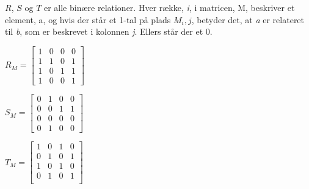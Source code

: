 \documentclass{article}
\begin{document}
$R$, $S$ og $T$ er alle binære relationer. Hver række, \emph{i}, i matricen, M, beskriver et element, a, og hvis der står et 1-tal på plads $M_i,j$, betyder det, at \emph{a} er relateret til \emph{b}, som er beskrevet i kolonnen \emph{j}. Ellers står der et 0.

\begin{center}
\begin{math}
R_M = \begin{bmatrix}
1 & 0 & 0 & 0 \\
1 & 1 & 0 & 1 \\
1 & 0 & 1 & 1 \\
1 & 0 & 0 & 1 
\end{bmatrix} 
\end{math}\par 
\begin{math}
S_M = \begin{bmatrix}
0 & 1 & 0 & 0 \\
0 & 0 & 1 & 1 \\
0 & 0 & 0 & 0 \\
0 & 1 & 0 & 0 
\end{bmatrix}
\end{math} \par 
\begin{math}
T_M = \begin{bmatrix}
1 & 0 & 1 & 0 \\
0 & 1 & 0 & 1 \\
1 & 0 & 1 & 0 \\
0 & 1 & 0 & 1 \\
\end{bmatrix}
\end{math}
\end{center}
\end{document}
